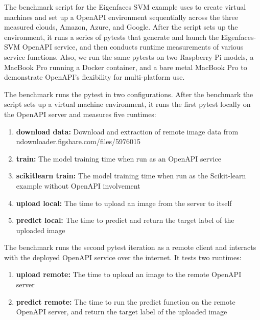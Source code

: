 The benchmark script for the Eigenfaces SVM example uses \Cloudmesh to
create virtual machines and set up a \Cloudmesh OpenAPI environment
sequentially across the three measured clouds, Amazon, Azure,
and Google. After the script sets up the environment, it runs a series
of pytests that generate and launch the Eigenfaces-SVM OpenAPI service,
and then conducts runtime measurements of various service functions. Also, we run the same pytests on two Raspberry Pi models, a MacBook Pro running a Docker container, and a bare metal MacBook Pro to demonstrate \Cloudmesh OpenAPI's flexibility for multi-platform use.

The benchmark runs the pytest in two configurations. After the benchmark
the script sets up a virtual machine environment, it runs the first pytest
locally on the OpenAPI server and measures five runtimes:

\begin{enumerate}
\def\labelenumi{\arabic{enumi}.}
\item \textbf{download data:} Download and extraction of remote image data from
  ndownloader.figshare.com/files/5976015
\item \textbf{train:} 
  The model training time when run as an OpenAPI service
\item \textbf{scikitlearn train:} 
  The model training time when run as the Scikit-learn example without
  OpenAPI involvement
\item \textbf{upload local:} 
  The time to upload an image from the server to itself
\item \textbf{predict local:} 
  The time to predict and return the target label of the uploaded image
\end{enumerate}

The benchmark runs the second pytest iteration as a remote client and interacts with the deployed OpenAPI service over the internet. It tests two runtimes:

\begin{enumerate}
\def\labelenumi{\arabic{enumi}.}
\item \textbf{upload remote:} 
  The time to upload an image to the remote OpenAPI server
\item \textbf{predict remote:} 
  The time to run the predict function on the remote OpenAPI server, and
  return the target label of the uploaded image
\end{enumerate}

